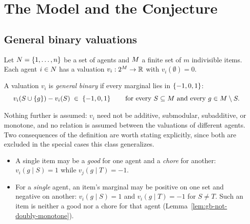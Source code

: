 \section{The Model and the Conjecture}
\label{sec:gb-framing}

\subsection{General binary valuations}
\label{sec:gb-model}

Let $N = \left\{1,\dots,n\right\}$ be a set of agents and $M$ a finite set of
$m$ indivisible items. Each agent $i \in N$ has a valuation
$v_i : 2^{M} \to \mathbb{R}$ with $v_i(\emptyset) = 0$.

\begin{definition}
\label{def:gb-class}
A valuation $v_i$ is \emph{general binary} if every marginal lies in
$\left\{-1,0,1\right\}$:
\[
  v_i(S \cup \left\{g\right\}) - v_i(S) \;\in\; \left\{-1,0,1\right\}
  \qquad\text{for every } S \subseteq M \text{ and every } g \in M \setminus S .
\]
\end{definition}

Nothing further is assumed: $v_i$ need not be additive, submodular,
subadditive, or monotone, and no relation is assumed between the valuations of
different agents. Two consequences of the definition are worth stating
explicitly, since both are excluded in the special cases this class
generalizes.

\begin{itemize}
  \item A single item may be a \emph{good} for one agent and a \emph{chore} for
    another: $v_i(g \mid S) = 1$ while $v_j(g \mid T) = -1$.
  \item For a \emph{single} agent, an item's marginal may be positive on one
    set and negative on another: $v_i(g \mid S) = 1$ and $v_i(g \mid T) = -1$
    for $S \ne T$. Such an item is neither a good nor a chore for that agent
    (Lemma~\ref{lem:gb-not-doubly-monotone}).
\end{itemize}

